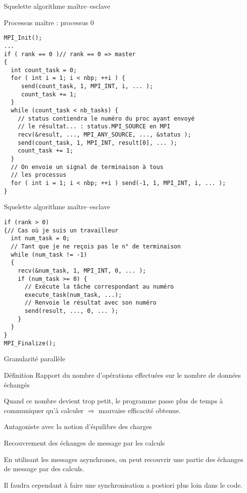 \documentclass[handout]{beamer}
\begin{document}
\begin{frame}[fragile]{Squelette algorithme maître--esclave}

Processus maître : processus 0

\begin{lstlisting}
MPI_Init();
...
if ( rank == 0 )// rank == 0 => master
{
  int count_task = 0;
  for ( int i = 1; i < nbp; ++i ) {
     send(count_task, 1, MPI_INT, i, ... );     
     count_task += 1;
  }
  while (count_task < nb_tasks) {
    // status contiendra le numéro du proc ayant envoyé
    // le résultat... : status.MPI_SOURCE en MPI
    recv(&result, ..., MPI_ANY_SOURCE, ..., &status );
    send(count_task, 1, MPI_INT, result[0], ... );     
    count_task += 1;    
  }
  // On envoie un signal de terminaison à tous
  // les processus
  for ( int i = 1; i < nbp; ++i ) send(-1, 1, MPI_INT, i, ... );
}
\end{lstlisting}
\end{frame}

\begin{frame}[fragile]{Squelette algorithme maître--esclave}

\begin{lstlisting}
if (rank > 0)
{// Cas où je suis un travailleur
  int num_task = 0;
  // Tant que je ne reçois pas le n° de terminaison
  while (num_task != -1)
  {
    recv(&num_task, 1, MPI_INT, 0, ... );
    if (num_task >= 0) {
      // Exécute la tâche correspondant au numéro
      execute_task(num_task, ...);
      // Renvoie le résultat avec son numéro 
      send(result, ..., 0, ... );
    }
  }
}
MPI_Finalize();
\end{lstlisting}
\end{frame}

\begin{frame}[fragile]{Granularité parallèle}


\begin{block}{Définition}
Rapport du nombre d'opérations effectuées sur le nombre de données
échangés
\end{block}

Quand ce nombre devient trop petit, le programme passe plus de temps à
communiquer qu'à calculer $\Rightarrow$ mauvaise efficacité obtenue.

Antagoniste avec la notion d'équilibre des charges
\end{frame}

\begin{frame}[fragile]{Recouvrement des échanges de message par les calculs}

En utilisant les messages asynchrones, on peut recouvrir une partie des
échanges de message par des calculs.

Il faudra cependant à faire une synchronisation a postiori plus loin dans
le code.

\end{frame}
\end{document}
